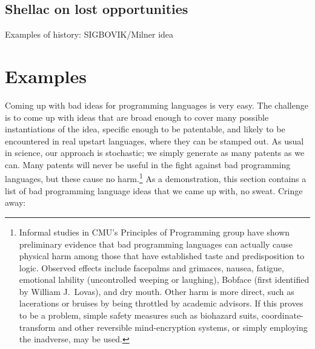 \documentclass[acmtocl]%
{boviktrans}
\begin{document}
\subsection{Shellac on lost opportunities}


Examples of history: SIGBOVIK/Milner idea


\section{Examples}


Coming up with bad ideas for programming languages is very easy. The
challenge is to come up with ideas that are broad enough to cover many
possible instantiations of the idea, specific enough to be patentable,
and likely to be encountered in real upstart languages, where they can
be stamped out. As usual in science, our approach is stochastic; we
simply generate as many patents as we can. Many patents will never be
useful in the fight against bad programming languages, but these cause
no harm.\!\footnote{Informal studies in CMU's Principles of
  Programming group have shown preliminary evidence that bad
  programming languages can actually cause physical harm among those
  that have established taste and predisposition to logic. Observed
  effects include facepalms and grimaces, nausea, fatigue, emotional
  lability (uncontrolled weeping or laughing), Bobface (first identified
  by William J.~Lovas), and dry mouth. Other harm is more direct, such
  as lacerations or bruises by being throttled by academic advisors.
  If this proves to be a problem, simple safety measures such as biohazard
  suits, coordinate-transform and other reversible mind-encryption systems,
  or simply employing the inadverse, may be used.}
As a demonstration, this section contains a list of bad programming language
ideas that we came up with, no sweat. Cringe away:
\end{document}
